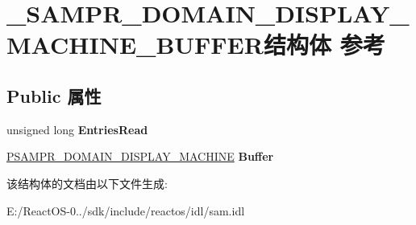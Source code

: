 \hypertarget{struct___s_a_m_p_r___d_o_m_a_i_n___d_i_s_p_l_a_y___m_a_c_h_i_n_e___b_u_f_f_e_r}{}\section{\+\_\+\+S\+A\+M\+P\+R\+\_\+\+D\+O\+M\+A\+I\+N\+\_\+\+D\+I\+S\+P\+L\+A\+Y\+\_\+\+M\+A\+C\+H\+I\+N\+E\+\_\+\+B\+U\+F\+F\+E\+R结构体 参考}
\label{struct___s_a_m_p_r___d_o_m_a_i_n___d_i_s_p_l_a_y___m_a_c_h_i_n_e___b_u_f_f_e_r}
\subsection*{Public 属性}
\begin{DoxyCompactItemize}
\item 
\mbox{\label{struct___s_a_m_p_r___d_o_m_a_i_n___d_i_s_p_l_a_y___m_a_c_h_i_n_e___b_u_f_f_e_r_aa0d5b3e5b589013074e1d6f20ba2cbcb}} 
unsigned long {\bfseries Entries\+Read}
\item 
\mbox{\label{struct___s_a_m_p_r___d_o_m_a_i_n___d_i_s_p_l_a_y___m_a_c_h_i_n_e___b_u_f_f_e_r_a56979a47c6cca4a8df64ecec8106c35f}} 
\hyperlink{struct___s_a_m_p_r___d_o_m_a_i_n___d_i_s_p_l_a_y___m_a_c_h_i_n_e}{P\+S\+A\+M\+P\+R\+\_\+\+D\+O\+M\+A\+I\+N\+\_\+\+D\+I\+S\+P\+L\+A\+Y\+\_\+\+M\+A\+C\+H\+I\+NE} {\bfseries Buffer}
\end{DoxyCompactItemize}


该结构体的文档由以下文件生成\+:\begin{DoxyCompactItemize}
\item 
E\+:/\+React\+O\+S-\/0../sdk/include/reactos/idl/sam.\+idl\end{DoxyCompactItemize}
